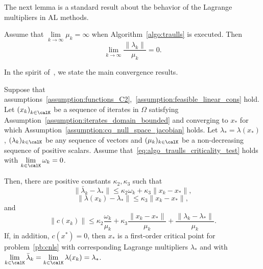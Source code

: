 The next lemma is a standard result about the behavior of the Lagrange multipliers in AL methods.
\begin{lemma}\label{lemma:behavior_multipliers}
	Assume that $\lim\limits_{k\to \infty} \mu_k = \infty$ when Algorithm~\ref{algo:traulls} is executed. Then 
	\begin{equation*}
		\lim\limits_{k\to \infty} \frac{\|\lambda_k\|}{\mu_k} = 0.
	\end{equation*}
\end{lemma}

In the spirit of~\cite[Lemma 4.3]{conn-etal:1996b}, we state the main convergence results.
\begin{lemma}\label{lemma:key_lemma}
	Suppose that assumptions~\ref{assumption:functions_C2},~\ref{assumption:feasible_linear_cons} hold. Let $\left(x_k\right)_{k\in \calK}$ be a sequence of iterates in $\Omega$ satisfying Assumption~\ref{assumption:iterates_domain_bounded} and converging to $x_*$ for which Assumption~\ref{assumption:cq_null_space_jacobian} holds. Let $\lambda_* = \lambda(x_*)$, $(\lambda_k)_{k \in \calK}$ be any sequence of vectors and $(\mu_k)_{k \in \calK}$ be a non-decreasing sequence of positive scalars. Assume that~\eqref{eq:algo_traulls_criticality_test} holds with $\lim\limits_{k \in \calK}\omega_k = 0$.
	
	Then, there are positive constants $\kappa_2, \kappa_3$ such that
	\begin{equation}\label{eq:bound_1st_order_mult}
		\|\bar{\lambda}_k - \lambda_* \| \le \kappa_2 \omega_k + \kappa_3 \|x_k-x_*\|,
	\end{equation}
	\begin{equation}\label{eq:bound_ls_mult}
		\|\lambda(x_k) - \lambda_* \| \le \kappa_3 \|x_k-x_*\|,
	\end{equation}
	and
	\begin{equation}\label{eq:bound_norm_cons}
		\|c(x_k)\| \le \kappa_2 \frac{\omega_k}{\mu_k} + \kappa_3 \frac{\|x_k-x_*\|}{\mu_k} + \frac{\|\lambda_k - \lambda_* \|}{\mu_k}.
	\end{equation}
	If, in addition, $c(x^*) = 0$, then $x_*$ is a first-order critical point for problem~\eqref{pb:cnls} with corresponding Lagrange multipliers $\lambda_*$ and with $\lim\limits_{k \in \calK} \bar{\lambda}_k = \lim\limits_{k \in \calK} \lambda(x_k) = \lambda_*$.
\end{lemma}

